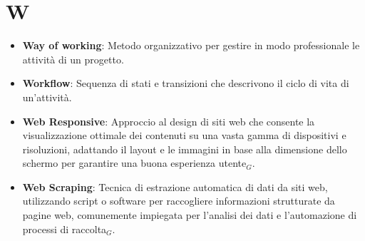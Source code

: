 \section{W}
\begin{itemize}
    \item \textbf{Way of working}: Metodo organizzativo per gestire in modo professionale le attività di un progetto.
    \item \textbf{Workflow}: Sequenza di stati e transizioni che descrivono il ciclo di vita di un’attività.
    \item \textbf{Web Responsive}: Approccio al design di siti web che consente la visualizzazione ottimale dei contenuti su una vasta gamma di dispositivi e risoluzioni, adattando il layout e le immagini in base alla dimensione dello schermo per garantire una buona esperienza utente$_G$.
    \item \textbf{Web Scraping}: Tecnica di estrazione automatica di dati da siti web, utilizzando script o software per raccogliere informazioni strutturate da pagine web, comunemente impiegata per l'analisi dei dati e l'automazione di processi di raccolta$_G$.
    
\end{itemize}
